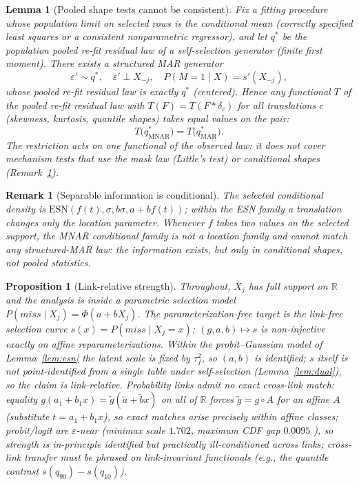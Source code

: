 \documentclass[conference]{IEEEtran}
\newtheorem{lemma}{Lemma}
\newtheorem{proposition}{Proposition}
\newtheorem{remark}{Remark}
\begin{document}
\begin{lemma}[Pooled shape tests cannot be consistent]\label{lem:pooled}
Fix a fitting procedure whose population limit on selected rows is the conditional mean (correctly specified least squares or a consistent nonparametric regressor), and let $q^\ast$ be the population pooled re-fit residual law of a self-selection generator (finite first moment). There exists a structured MAR generator
\begin{equation}
\varepsilon'\sim q^\ast,\quad \varepsilon'\perp X_{-j},\quad P(M{=}1\mid X)=s'(X_{-j}),
\label{eq:mar_generator}
\end{equation}
whose pooled re-fit residual law is exactly $q^\ast$ (centered). Hence any functional $T$ of the pooled re-fit residual law with $T(F)=T(F*\delta_c)$ for all translations $c$ (skewness, kurtosis, quantile shapes) takes equal values on the pair:
\begin{equation}
T\bigl(q^\ast_{\mathrm{MNAR}}\bigr)=T\bigl(q^\ast_{\mathrm{MAR}}\bigr).
\label{eq:pooled_match}
\end{equation} The restriction acts on one functional of the observed law: it does not cover mechanism tests that use the mask law (Little's test) or conditional shapes (Remark~\ref{rem:sep}).
\end{lemma}

\begin{remark}[Separable information is conditional]\label{rem:sep}
The selected conditional density is $\mathrm{ESN}(f(t),\sigma,b\sigma,a+bf(t))$; within the ESN
family a translation changes only the location parameter. Whenever $f$ takes two values on the
selected support, the MNAR conditional family is not a location family and cannot match any
structured-MAR law: the information exists, but only in \emph{conditional} shapes, not pooled
statistics.
\end{remark}

\begin{proposition}[Link-relative strength]\label{prop:link}
Throughout, $X_j$ has full support on $\mathbb{R}$ and the analysis is inside a parametric
selection model $P(\mathit{miss}\mid X_j)=\Phi(a+bX_j)$. The parameterization-free target is the
link-free selection curve $s(x)=P(\mathit{miss}\mid X_j=x)$;
$(g,a,b)\mapsto s$ is non-injective exactly on affine reparameterizations. Within the
probit--Gaussian model of Lemma~\ref{lem:esn} the latent scale is fixed by $\tau_f^2$, so $(a,b)$
is identified; $s$ itself is not point-identified from a single table under self-selection
(Lemma~\ref{lem:dual}), so the claim is link-relative. Probability links admit
no exact cross-link match: equality $g(a_1{+}b_1x)=\tilde g(\tilde a{+}\tilde b x)$ on all of
$\mathbb{R}$ forces $\tilde g=g\circ A$ for an affine $A$ (substitute $t=a_1{+}b_1x$), so exact
matches arise precisely within affine classes; probit/logit are $\varepsilon$-near (minimax scale $1.702$, maximum CDF
gap $0.0095$ \cite{haley1952,amemiya1981}), so strength is in-principle identified but practically
ill-conditioned across links; cross-link transfer must be phrased on link-invariant functionals
(e.g., the quantile contrast $s(q_{90})-s(q_{10})$).
\end{proposition}
\end{document}
